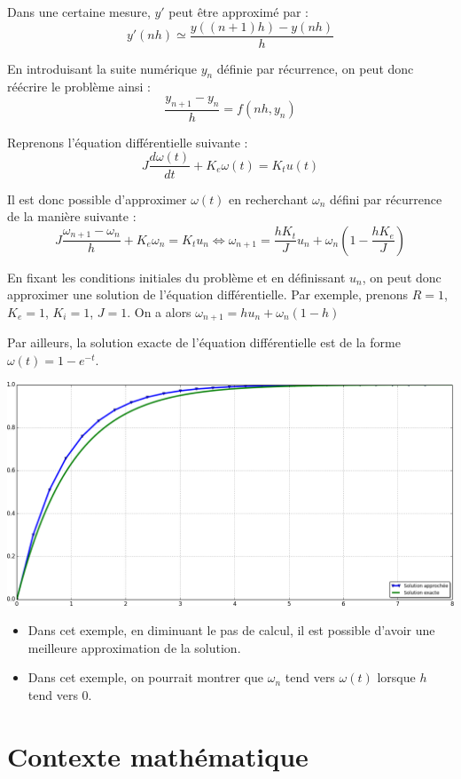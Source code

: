 \documentclass[10pt]{article}
\begin{document}
Dans une certaine mesure, $y'$ peut être approximé par :
$$
y'(nh)\simeq \dfrac{y((n+1)h)-y(nh)}{h}
$$

En introduisant la suite numérique $y_n$ définie par récurrence, on peut donc réécrire le problème ainsi :
$$
\dfrac{y_{n+1}-y_n}{h} = f(nh,y_n)
$$

\begin{exemple}
Reprenons l'équation différentielle suivante :
$$
J \dfrac{d\omega(t)}{dt} + K_e\omega(t)=  K_t u(t)
$$

Il est donc possible d'approximer $\omega(t)$ en recherchant $\omega_n$ défini par récurrence de la manière suivante :
$$
J \dfrac{\omega_{n+1}-\omega_n}{h} + K_e\omega_n=  K_t u_n \Longleftrightarrow 
\omega_{n+1} =  \dfrac{h K_t}{J} u_n +  \omega_n\left(1-\dfrac{h K_e}{J}\right)
$$

En fixant les conditions initiales du problème et en définissant $u_n$, on peut donc approximer une solution de l'équation différentielle. 
Par exemple, prenons $R=1$, $K_e=1$, $K_i=1$, $J=1$. On a alors $\omega_{n+1} =  h  u_n +  \omega_n\left(1-h\right)$

Par ailleurs, la solution exacte de l'équation différentielle est de la forme $\omega(t)=1-e^{-t}$.

\end{exemple}

\begin{center}
\includegraphics[width=.6\textwidth]{images/figure_1}
\end{center}

\begin{rem}
\begin{itemize}
\item Dans cet exemple, en diminuant le pas de calcul, il est possible d'avoir une meilleure approximation de la solution. 
\item Dans cet exemple, on pourrait montrer que $\omega_n$ tend vers $\omega(t)$ lorsque $h$ tend vers 0.
\end{itemize}
\end{rem}


\section{Contexte mathématique}
\end{document}
